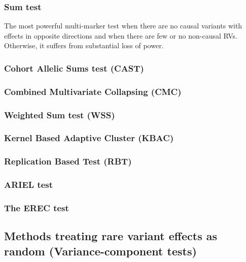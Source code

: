 \documentclass[]{book}
\theoremstyle{definition}
\theoremstyle{definition}
\theoremstyle{definition}
\theoremstyle{remark}
\begin{document}
\subsubsection{Sum test}\label{sum-test}

The most powerful multi-marker test when there are no causal variants
with effects in opposite directions and when there are few or no
non-causal RVs. Otherwise, it suffers from substantial loss of power.

\subsubsection{Cohort Allelic Sums test
(CAST)}\label{cohort-allelic-sums-test-cast}

\subsubsection{Combined Multivariate Collapsing
(CMC)}\label{combined-multivariate-collapsing-cmc}

\subsubsection{Weighted Sum test (WSS)}\label{weighted-sum-test-wss}

\subsubsection{Kernel Based Adaptive Cluster
(KBAC)}\label{kernel-based-adaptive-cluster-kbac}

\subsubsection{Replication Based Test
(RBT)}\label{replication-based-test-rbt}

\subsubsection{ARIEL test}\label{ariel-test}

\subsubsection{The EREC test}\label{the-erec-test}

\subsection{Methods treating rare variant effects as random
(Variance-component
tests)}\label{methods-treating-rare-variant-effects-as-random-variance-component-tests}
\end{document}
